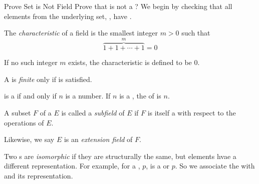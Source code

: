 \begin{example}{Prove Set is Not Field}
  Prove that  is not a ?
  \tcblower{}
  We begin by checking that all elements from the underlying set, , have .
\end{example}

\begin{definition}[Characteristic]\label{def:Field_Characteristic}
  The \emph{characteristic} of a field is the smallest integer $m > 0$ such that
  \begin{equation}\label{eq:Field_Characteristic}
    \overbrace{1 + 1 + \cdots + 1}^{m} = 0
  \end{equation}

  If no such integer $m$ exists, the characteristic is defined to be 0.
\end{definition}

\begin{definition}\label{def:Finite_Field}
  A  is \emph{finite} only if  is satisfied.
\end{definition}

\begin{theorem}\label{thm:Finite_Field}
  \TextIntsModN{} is a  if and only if $n$ is a  number.
  If $n$ is a , the  of \TextIntsModN{} is $n$.
\end{theorem}

\begin{definition}[Subfield]\label{def:Subfield}
  A subset $F$ of a  $E$ is called a \emph{subfield} of $E$ if $F$ is itself a  with respect to the operations of $E$.
  
  \begin{remark}\label{rmk:Extension_Field}
    Likewise, we say $E$ is an \emph{extension field} of $F$.
  \end{remark}
\end{definition}

\begin{definition}[Isomorphism]\label{def:Isomorphism}
  Two s are \emph{isomorphic} if they are structurally the same, but elements hvae a different representation.
  For example, for a , $p$,  is a  or  $p$.
  So we associate the   with  and its representation.
\end{definition}

